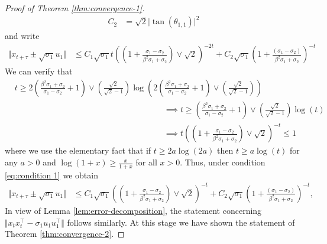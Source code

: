 \begin{proof}[Proof of Theorem \ref{thm:convergence-1}]
\begin{align*}
           C_2 & = \sqrt{2}\vert \tan(\theta_{1, 1}) \vert^2
    \end{align*}
    and write 
    \begin{align*}
         \Vert x_{t+\tau} \pm \sqrt{\sigma_1} u_1 \Vert & \le C_1  \sqrt{\sigma_1} t  \left( \left(1 + \frac{\sigma_1 - \sigma_2 }{\beta^2 \sigma_1 + \sigma_2}\right) \vee \sqrt{2}  \right)^{-2t} + C_2\sqrt{\sigma_1}  \left( 1 + \frac{ (\sigma_1 - \sigma_2)}{ \beta^2 \sigma_1   +  \sigma_2} \right)^{-t}
    \end{align*}
    We can verify that 
    \begin{align}
        & t \ge 2 \left( \frac{\beta^2 \sigma_1 + \sigma_2}{\sigma_1 - \sigma_2} + 1 \right) \vee \left(\frac{\sqrt{2}}{\sqrt{2} - 1} \right)\log\left( 2 \left( \frac{\beta^2 \sigma_1 + \sigma_2}{\sigma_1 - \sigma_2} + 1 \right) \vee \left(\frac{\sqrt{2}}{\sqrt{2} - 1} \right) \right)  \label{eq:condition 1} \\
        & \qquad \qquad \qquad \qquad\qquad \qquad \qquad \qquad \qquad \implies t \ge \left( \frac{\beta^2 \sigma_1 + \sigma_2}{\sigma_1 - \sigma_2} + 1 \right) \vee \left(\frac{\sqrt{2}}{\sqrt{2} - 1} \right)\log(t)    \\
        & \qquad \qquad\qquad \qquad\qquad \qquad \qquad \qquad \qquad \implies t \left( \left(1 + \frac{\sigma_1 - \sigma_2 }{\beta^2 \sigma_1 + \sigma_2}\right) \vee \sqrt{2}  \right)^{-t} \le 1
    \end{align}
    where we use the elementary fact that if $t \ge 2a \log(2a)$ then $t \ge a \log(t)$ for any $a > 0$ and  $\log(1 + x) \ge \frac{x}{1 + x}$ for all $x > 0$.
    Thus, under condition \eqref{eq:condition 1}
    we obtain 
    \begin{align*}
         \Vert x_{t+\tau} \pm \sqrt{\sigma_1} u_1 \Vert & \le C_1  \sqrt{\sigma_1}   \left( \left(1 + \frac{\sigma_1 - \sigma_2 }{\beta^2 \sigma_1 + \sigma_2}\right) \vee \sqrt{2}  \right)^{-t} + C_2\sqrt{\sigma_1}  \left( 1 + \frac{ (\sigma_1 - \sigma_2)}{ \beta^2 \sigma_1   +  \sigma_2} \right)^{-t},
    \end{align*}
    In view of Lemma \ref{lem:error-decomposition}, the statement concerning $\Vert x_t x_t^\top - \sigma_1 u_1 u_1^\top \Vert$ follows similarly. At this stage we have shown the statement of Theorem \ref{thm:convergence-2}.
    

\end{proof}
